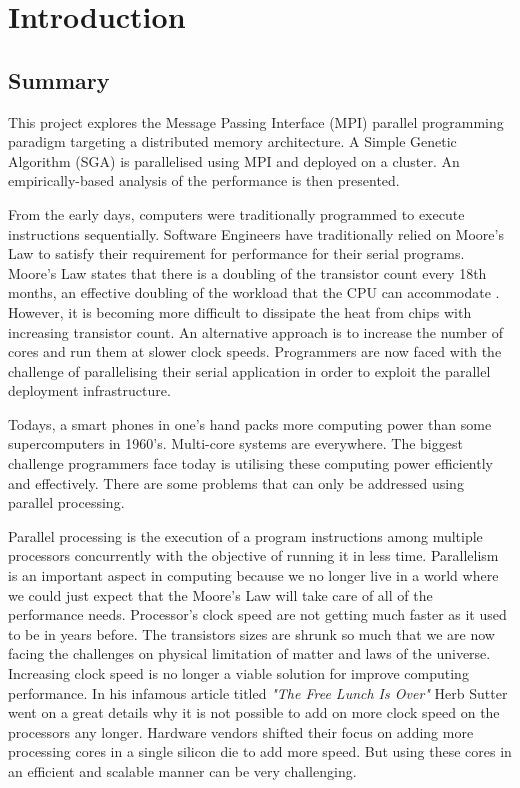 \setcounter{page}{1}
\chapter{Introduction}
\label{intro}
\section{Summary}
This project explores the Message Passing Interface (MPI) parallel programming paradigm targeting a distributed memory architecture. A Simple Genetic Algorithm (SGA) is parallelised using MPI and deployed on a cluster. An empirically-based analysis of the performance is then presented.

From the early days, computers were traditionally programmed to execute instructions sequentially. Software Engineers have traditionally relied on Moore's Law \citep{Sutter:05} to satisfy their requirement for performance for their serial programs. Moore's Law \citep{schaller1997moore} states that there is a doubling of the transistor count every 18th months, an effective doubling of the workload that the CPU can accommodate . However, it is becoming more difficult to dissipate the heat from chips with increasing transistor count\citep{kim2003leakage}. An alternative approach \citep{Sutter:05} is to increase the number of cores and run them at slower clock speeds. Programmers are now faced with the challenge of parallelising their serial application in order to exploit the parallel deployment infrastructure.

Todays, a smart phones in one's hand packs more computing power than some supercomputers in 1960's. Multi-core systems are everywhere. The biggest challenge programmers face today is utilising these computing power efficiently and effectively. There are some problems that can only be addressed using parallel processing.

Parallel processing is the execution of a program instructions among multiple processors concurrently with the objective of running it in less time\citep{Barney:16}. Parallelism is an important aspect in computing because we no longer live in a world where we could just expect that the Moore's Law will take care of all of the performance needs. Processor's clock speed are not getting much faster as it used to be in years before. The transistors sizes are shrunk so much that we are now facing the challenges on physical limitation of matter and laws of the universe. Increasing clock speed is no longer a viable solution for improve computing performance. In his infamous article titled \textit{"The Free Lunch Is Over"} Herb Sutter went on a great details why it is not possible to add on more clock speed on the processors any longer\citep{Sutter:05}. Hardware vendors shifted their focus on adding more processing cores in a single silicon die to add more speed. But using these cores in an efficient and scalable manner can be very challenging.

